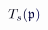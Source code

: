 \documentclass[12pt]{article}
\begin{document}
\makeatletter
\renewcommand*{\@textcolor}[3]{%
  \protect\leavevmode
  \begingroup
    \color#1{#2}#3%
  \endgroup
}
\makeatother
\begin{displaymath}
\mathcolor[RGB]{0,0,15}{T} _ { \mathcolor[RGB]{0,0,30}{s} } \mathcolor[RGB]{0,0,45}{(} { \mathfrak { \mathcolor[RGB]{0,0,60}{p} } } \mathcolor[RGB]{0,0,75}{)}
\end{displaymath}
\end{document}
